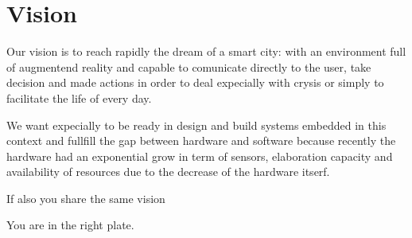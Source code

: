 \section{Vision}

Our vision is to reach rapidly the dream of a smart city: with an environment full of augmentend reality and capable to comunicate directly to the user, take decision and made actions in order to deal expecially with crysis or simply to facilitate the life of every day.

We want expecially to be ready in design and build systems embedded in this context and fullfill the gap between hardware and software because recently the hardware had an exponential grow in term of sensors, elaboration capacity and availability of resources due to the decrease of the hardware itserf.

If also you share the same vision

You are in the right plate.
